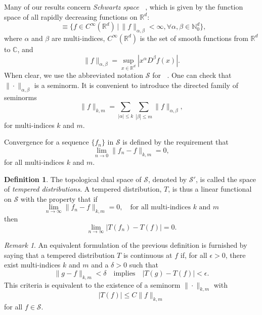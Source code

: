 \documentclass[prl,twocolumn,lengthcheck,superscriptaddress]{revtex4-1}
\DeclareMathOperator{\Schw}{\mathscr{S}(\mathbb{R}^{\mathit{d}})}
\theoremstyle{definition}
\newtheorem{definition}{Definition}
\theoremstyle{remark}
\newtheorem{remark}{Remark}
\begin{document}
Many of our results concern \emph{Schwartz space} $\Schw$, which is given by the function space of all rapidly decreasing functions on $\mathbb{R}^d$:
\begin{equation}
	\Schw \equiv \{ f\in C^{\infty}(\mathbb{R}^d)\, |\, \|f\|_{\alpha,\beta} < \infty, \forall \alpha, \beta \in \mathbb{N}_0^d\},
\end{equation}
where $\alpha$ and $\beta$ are multi-indices, $C^{\infty}(\mathbb{R}^d)$ is the set of smooth functions from $\mathbb{R}^d$ to $\mathbb{C}$, and
\begin{equation}
	\|f\|_{\alpha,\beta} = \sup_{x\in\mathbb{R}^d} |x^\alpha D^{\beta} f(x)|.
\end{equation}
When clear, we use the abbreviated notation $\mathscr{S}$ for $\Schw$. One can check that $\|\cdot\|_{\alpha,\beta}$ is a seminorm. It is convenient to introduce the directed family of seminorms 
\begin{equation}
	\|f\|_{k,m} = \sum_{|\alpha|\le k} \sum_{|\beta|\le m} \|f\|_{\alpha,\beta},
\end{equation}
for multi-indices $k$ and $m$.


Convergence for a sequence $\{f_n\}$ in $\mathscr{S}$ is defined by the requirement that 
\begin{equation}
	\lim_{n\rightarrow 0} \|f_n - f\|_{k,m} = 0,
\end{equation}
for all multi-indices $k$ and $m$.

\begin{definition}
	The topological dual space of $\mathscr{S}$, denoted by $\mathscr{S}'$, is called the space of \emph{tempered distributions}. 
A tempered distribution, $T$, is thus a linear functional on $\mathscr{S}$ with the property that if
\begin{equation}
	\lim_{n\rightarrow\infty} \|f_n - f\|_{k,m} = 0, \quad \text{for all multi-indices $k$ and $m$}
\end{equation}
then
\begin{equation}
	\lim_{n\rightarrow\infty}|T(f_n) - T(f)| = 0.
\end{equation}
\end{definition}

\begin{remark}
	An equivalent formulation of the previous definition is furnished by saying that a tempered distribution $T$ is continuous at $f$ if, for all $ \epsilon > 0$, there exist multi-indices $k$ and $m$ and a $\delta > 0$ such that 
	\begin{equation}
		\|g-f\|_{k,m} < \delta \quad \text{implies} \quad |T(g)-T(f)| < \epsilon.
	\end{equation}
	This criteria is equivalent to the existence of a seminorm $\|\cdot\|_{k,m}$ with 
	\begin{equation}\label{eq:tdcty}
		|T(f)| \le C\|f\|_{k,m}
	\end{equation}
	for all $f\in \mathscr{S}$.
\end{remark}
\end{document}
